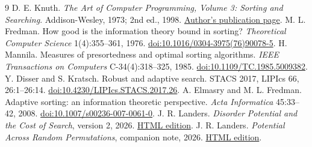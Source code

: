 \documentclass[10pt,letterpaper]{article}
\begin{document}
{\footnotesize
\begin{thebibliography}{9}
 D. E. Knuth. \emph{The Art of Computer Programming,
Volume 3: Sorting and Searching}. Addison-Wesley, 1973; 2nd ed., 1998.
\href{https://cs.stanford.edu/~knuth/taocp.html}{Author's publication page}.
 M. L. Fredman. How good is the information theory
bound in sorting? \emph{Theoretical Computer Science} 1(4):355--361,
1976. \href{https://doi.org/10.1016/0304-3975(76)90078-5}
{doi:10.1016/0304-3975(76)90078-5}.
 H. Mannila. Measures of presortedness and optimal
sorting algorithms. \emph{IEEE Transactions on Computers}
C-34(4):318--325, 1985.
\href{https://doi.org/10.1109/TC.1985.5009382}{doi:10.1109/TC.1985.5009382}.
 Y. Disser and S. Kratsch. Robust and adaptive search.
STACS 2017, LIPIcs 66, 26:1--26:14.
\href{https://doi.org/10.4230/LIPIcs.STACS.2017.26}
{doi:10.4230/LIPIcs.STACS.2017.26}.
 A. Elmasry and M. L. Fredman. Adaptive sorting:
an information theoretic perspective. \emph{Acta Informatica}
45:33--42, 2008.
\href{https://doi.org/10.1007/s00236-007-0061-0}
{doi:10.1007/s00236-007-0061-0}.
 J. R. Landers. \emph{Disorder Potential and the Cost of
Search}, version 2, 2026.
\href{https://jonland82.github.io/algorithmic-search-cost/disorder_potential_search_note_v2.html}
{HTML edition}.
 J. R. Landers. \emph{Potential Across Random
Permutations}, companion note, 2026.
\href{https://jonland82.github.io/algorithmic-search-cost/experiments/n9-potential-distribution/potential_across_random_permutations.html}
{HTML edition}.
\end{thebibliography}
}
\end{document}
